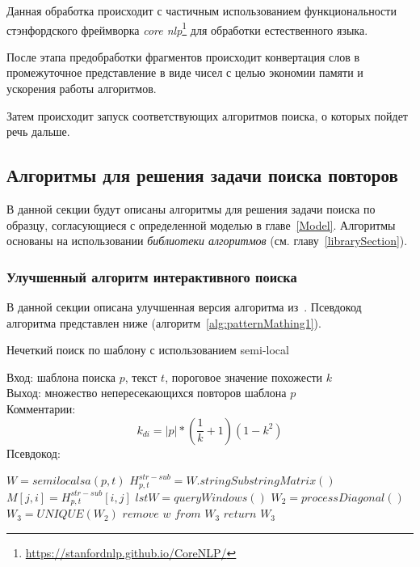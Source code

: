 Данная обработка происходит с частичным использованием функциональности стэнфордского  фреймворка \emph{core nlp}\footnote{\url{https://stanfordnlp.github.io/CoreNLP/}} для обработки естественного языка.

После этапа предобработки фрагментов происходит конвертация слов  в промежуточное представление в виде чисел с целью экономии памяти и ускорения работы алгоритмов.

Затем  происходит запуск соответствующих алгоритмов поиска, о которых пойдет речь дальше.


\subsection{Алгоритмы для решения задачи поиска повторов}\label{fics}

В данной секции будут описаны алгоритмы для решения задачи поиска по образцу, согласующиеся с определенной моделью в главе~\ref{Model}.
Алгоритмы основаны на использовании \emph{библиотеки алгоритмов} (см. главу~\ref{librarySection}).


\subsubsection{Улучшенный алгоритм интерактивного поиска}
В данной секции описана улучшенная версия алгоритма из~\cite{luciv2019interactive}. Псевдокод алгоритма представлен ниже (алгоритм~\ref{alg:patternMathing1}).

\begin{algorithm}[t!]
\caption{Нечеткий поиск по шаблону с использованием semi-local}\label{alg:patternMathing1}
Вход: шаблона поиска $p$, текст $t$, пороговое значение похожести $k$\\
Выход: множество непересекающихся повторов шаблона $p$\\
Комментарии:
\begin{equation}
    k_{di}=|p|*(\frac{1}{k}+1)(1-k^2)
\end{equation}
Псевдокод:
\begin{algorithmic}[1]
\State $W = semilocalsa(p,t)$
\State $ H^{str-sub}_{p,t} =  W.stringSubstringMatrix()$
\State $ M[j,i] = H^{str-sub}_{p,t}[i,j] $
\State $lstW = queryWindows()$
\State $W_2 = processDiagonal()$
\State $W_3 = UNIQUE(W_2)$
\State $remove$ $w$ $from$ $W_3$
\EndIf
\EndFor
\State $return$ $W_3$

\end{algorithmic}
\end{algorithm}

